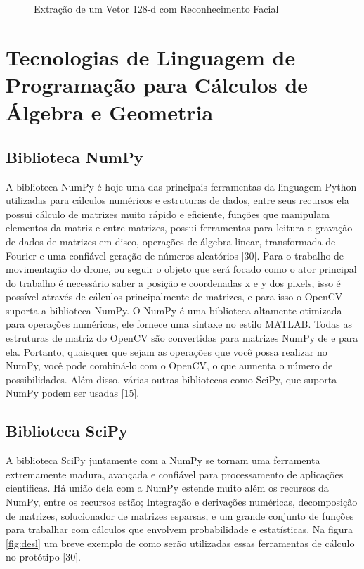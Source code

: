 \begin{figure}[H]
	\centering
	\caption{Extração de um Vetor 128-d com Reconhecimento Facial}
	\fontsize{9pt}{12pt}\selectfont
	\def\svgwidth{13cm}
	
	\label{fig:ext128d}
\end{figure}

\section{Tecnologias de Linguagem de Programação para Cálculos de Álgebra e Geometria}

\subsection{Biblioteca NumPy}
A biblioteca NumPy é hoje uma das principais ferramentas da linguagem Python utilizadas para cálculos numéricos e estruturas de dados, entre seus recursos ela possui cálculo de matrizes muito rápido e eficiente, funções que manipulam elementos da matriz e entre matrizes, possui ferramentas para leitura e gravação de dados de matrizes em disco, operações de álgebra linear, transformada de Fourier e uma confiável geração de números aleatórios [30]. 
Para o trabalho de movimentação do drone, ou seguir o objeto que será focado como o ator principal do trabalho é necessário saber a posição e coordenadas x e y dos pixels, isso é possível através de cálculos principalmente de matrizes, e para isso o OpenCV suporta a biblioteca NumPy.
 O NumPy é uma biblioteca altamente otimizada para operações numéricas, ele fornece uma sintaxe no estilo MATLAB. Todas as estruturas de matriz do OpenCV são convertidas para matrizes NumPy de e para ela. Portanto, quaisquer que sejam as operações que você possa realizar no NumPy, você pode combiná-lo com o OpenCV, o que aumenta o número de possibilidades. Além disso, várias outras bibliotecas como SciPy, que suporta NumPy podem ser usadas [15]. 

\subsection{Biblioteca SciPy}
A biblioteca SciPy juntamente com a NumPy se tornam uma ferramenta extremamente madura, avançada e confiável para processamento de aplicações cientificas. Há união dela com a NumPy estende muito além os recursos da NumPy, entre os recursos estão; Integração e derivações numéricas, decomposição de matrizes, solucionador de matrizes esparsas, e um grande conjunto de funções para trabalhar com cálculos que envolvem probabilidade e estatísticas. 
Na figura \ref{fig:desl} um breve exemplo de como serão utilizadas essas ferramentas de cálculo no protótipo [30].

